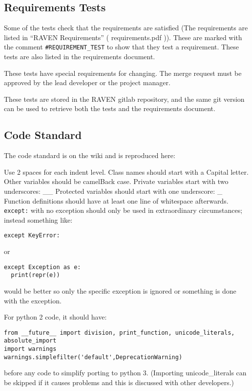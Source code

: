 \documentclass{article}
\begin{document}
\subsection{Requirements Tests}

Some of the tests check that the requirements are satisfied (The
requirements are listed in ``RAVEN Requirements'' ( requirements.pdf
)).  These are marked with the comment \verb'#REQUIREMENT_TEST' to show
that they test a requirement.  These tests are also listed in the
requirements document.

These tests have special requirements for changing.  The merge request
must be approved by the lead developer or the project manager.

These tests are stored in the RAVEN gitlab repository, and the same
git version can be used to retrieve both the tests and the
requirements document.

\subsection{Code Standard}
\label{code_standard}

The code standard is on the wiki and is reproduced here:

Use 2 spaces for each indent level. Class names should start with a
Capital letter. Other variables should be camelBack case. Private
variables start with two underscores: \_\_ Protected variables should
start with one underscore: \_ Function definitions should have at least
one line of whitespace afterwards. \verb'except:' with no exception should
only be used in extraordinary circumstances; instead something like:
\begin{verbatim}
except KeyError:
\end{verbatim}
or
\begin{verbatim}
except Exception as e:
  print(repr(e))
\end{verbatim}
would be better so only the specific exception is ignored or something
is done with the exception.

For python 2 code, it should have:

\begin{verbatim}
from __future__ import division, print_function, unicode_literals, absolute_import
import warnings
warnings.simplefilter('default',DeprecationWarning)
\end{verbatim}

before any code to simplify porting to python 3. (Importing unicode\_literals can be skipped if it causes problems and this is discussed with other developers.)
\end{document}
